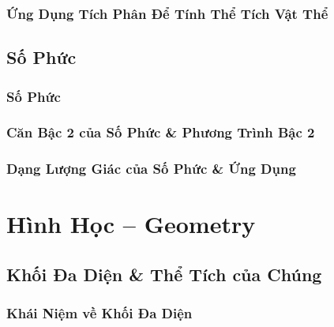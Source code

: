 \documentclass[oneside]{book}
\numberwithin{equation}{section}
\begin{document}

\section{Ứng Dụng Tích Phân Để Tính Thể Tích Vật Thể}


\chapter{Số Phức}

\section{Số Phức}


\section{Căn Bậc 2 của Số Phức \& Phương Trình Bậc 2}


\section{Dạng Lượng Giác của Số Phức \& Ứng Dụng}


\part{Hình Học -- Geometry}

\chapter{Khối Đa Diện \& Thể Tích của Chúng}

\section{Khái Niệm về Khối Đa Diện}

\end{document}
